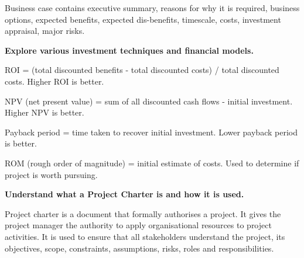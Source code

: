 Business case contains executive summary, reasons for why it is required, business options, expected benefits, expected dis-benefits, timescale, costs, investment appraisal, major risks.

\textbf{Explore various investment techniques and financial models.}

ROI = (total discounted benefits - total discounted costs) / total discounted costs. Higher ROI is better.

NPV (net present value) = sum of all discounted cash flows - initial investment. Higher NPV is better.

Payback period = time taken to recover initial investment. Lower payback period is better.

ROM (rough order of magnitude) = initial estimate of costs. Used to determine if project is worth pursuing.

\textbf{Understand what a Project Charter is and how it is used.}

Project charter is a document that formally authorises a project. It gives the project manager the authority to apply organisational resources to project activities. It is used to ensure that all stakeholders understand the project, its objectives, scope, constraints, assumptions, risks, roles and responsibilities.

